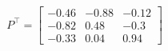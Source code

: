 \documentclass[preview]{standalone}
\begin{document}
\begin{align*}
P^\top=\left[\begin{matrix}-0.46&-0.88&-0.12\\-0.82&0.48&-0.3\\-0.33&0.04&0.94\end{matrix}\right]
\end{align*}
\end{document}
